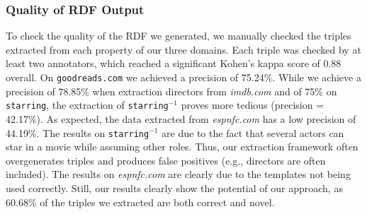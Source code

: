 \subsubsection{Quality of RDF Output}
To check the quality of the RDF we generated, we manually checked the triples extracted from each property of our three domains.
Each triple was checked by at least two annotators, which reached a significant Kohen's kappa score of 0.88 overall.
On \texttt{goodreads.com} we achieved a precision of 75.24\%.
While we achieve a precision of 78.85\% when extraction directors from \emph{imdb.com} and of 75\% on \texttt{starring}, the extraction of \texttt{starring}$^{-1}$ proves more tedious (precision = 42.17\%).
As expected, the data extracted from \emph{espnfc.com} has a low precision of 44.19\%.
The results on \texttt{starring}$^{-1}$ are due to the fact that several actors can star in a movie while assuming other roles. 
Thus, our extraction framework often overgenerates triples and produces false positives (e.g., directors are often included).
The results on \emph{espnfc.com} are clearly due to the templates not being used correctly.
Still, our results clearly show the potential of our approach, as 60.68\% of the triples we extracted are both correct and novel.
